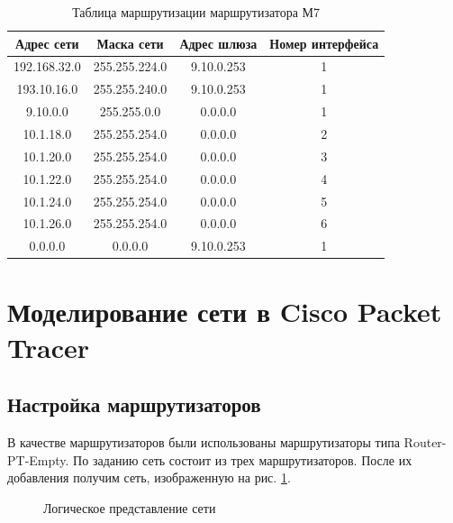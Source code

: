\documentclass[a4paper, 14pt]{extarticle}
\begin{document}
\begin{table}[H]
  \centering
  \setlength{\tabcolsep}{20pt}
  \caption{Таблица маршрутизации маршрутизатора М7}
  \begin{tabular}{|c|c|c|c|}
    \hline
    Адрес сети   & Маска сети    & Адрес шлюза & Номер интерфейса \\
    \hline
    192.168.32.0 & 255.255.224.0 & 9.10.0.253  & 1                \\
    \hline
    193.10.16.0  & 255.255.240.0 & 9.10.0.253  & 1                \\
    \hline
    9.10.0.0     & 255.255.0.0   & 0.0.0.0     & 1                \\
    \hline
    10.1.18.0    & 255.255.254.0 & 0.0.0.0     & 2                \\
    \hline
    10.1.20.0    & 255.255.254.0 & 0.0.0.0     & 3                \\
    \hline
    10.1.22.0    & 255.255.254.0 & 0.0.0.0     & 4                \\
    \hline
    10.1.24.0    & 255.255.254.0 & 0.0.0.0     & 5                \\
    \hline
    10.1.26.0    & 255.255.254.0 & 0.0.0.0     & 6                \\
    \hline
    0.0.0.0      & 0.0.0.0       & 9.10.0.253  & 1                \\
    \hline
  \end{tabular}
\end{table}

\section{Моделирование сети в Cisco Packet Tracer}

\subsection{Настройка маршрутизаторов}

В качестве маршрутизаторов были использованы маршрутизаторы типа
Router-PT-Empty. По заданию сеть состоит из трех маршрутизаторов. После их
добавления получим сеть, изображенную на рис. \ref{fig:network-1.png}.

\begin{figure}[H]
  \centering
  \caption{Логическое представление сети}
  \label{fig:network-1.png}
\end{figure}
\end{document}
